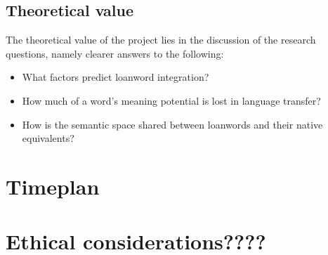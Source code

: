\documentclass[a4paper]{article}
\begin{document}
\subsection{Theoretical value}
The theoretical value of the project lies in the discussion of the research questions, namely clearer answers to the following:
\begin{itemize}
	\item What factors predict loanword integration?
	\item How much of a word's meaning potential is lost in language transfer?
	\item How is the semantic space shared between loanwords and their native equivalents?	
\end{itemize}




\section{Timeplan}



\section{Ethical considerations????}



{}

\end{document}
